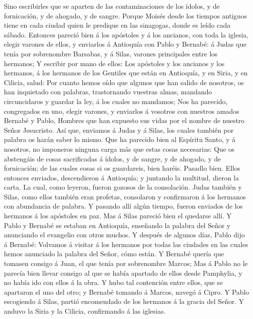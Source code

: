  Sino escribirles que se aparten de las contaminaciones de
los ídolos, y de fornicación, y de ahogado, y de sangre. 
Porque Moisés desde los tiempos antiguos tiene en cada ciudad quien le
predique en las sinagogas, donde es leído cada sábado. 
Entonces pareció bien á los apóstoles y á los ancianos, con toda la
iglesia, elegir varones de ellos, y enviarlos á Antioquía con Pablo y
Bernabé: á Judas que tenía por sobrenombre Barsabas, y á Silas, varones
principales entre los hermanos;  Y escribir por mano de
ellos: Los apóstoles y los ancianos y los hermanos, á los hermanos de
los Gentiles que están en Antioquía, y en Siria, y en Cilicia, salud:
 Por cuanto hemos oído que algunos que han salido de
nosotros, os han inquietado con palabras, trastornando vuestras almas,
mandando circuncidaros y guardar la ley, á los cuales no mandamos;
 Nos ha parecido, congregados en uno, elegir varones, y
enviarlos á vosotros con nuestros amados Bernabé y Pablo, 
Hombres que han expuesto sus vidas por el nombre de nuestro Señor
Jesucristo.  Así que, enviamos á Judas y á Silas, los
cuales también por palabra os harán saber lo mismo.  Que ha
parecido bien al Espíritu Santo, y á nosotros, no imponeros ninguna
carga más que estas cosas necesarias:  Que os abstengáis de
cosas sacrificadas á ídolos, y de sangre, y de ahogado, y de
fornicación; de las cuales cosas si os guardareis, bien haréis. Pasadlo
bien.  Ellos entonces enviados, descendieron á Antioquía; y
juntando la multitud, dieron la carta.  La cual, como
leyeron, fueron gozosos de la consolación.  Judas también y
Silas, como ellos también eran profetas, consolaron y confirmaron á los
hermanos con abundancia de palabra.  Y pasando allí algún
tiempo, fueron enviados de los hermanos á los apóstoles en paz.
 Mas á Silas pareció bien el quedarse allí.  Y
Pablo y Bernabé se estaban en Antioquía, enseñando la palabra del Señor
y anunciando el evangelio con otros muchos.  Y después de
algunos días, Pablo dijo á Bernabé: Volvamos á visitar á los hermanos
por todas las ciudades en las cuales hemos anunciado la palabra del
Señor, cómo están.  Y Bernabé quería que tomasen consigo á
Juan, el que tenía por sobrenombre Marcos;  Mas á Pablo no
le parecía bien llevar consigo al que se había apartado de ellos desde
Pamphylia, y no había ido con ellos á la obra.  Y hubo tal
contención entre ellos, que se apartaron el uno del otro; y Bernabé
tomando á Marcos, navegó á Cipro.  Y Pablo escogiendo á
Silas, partió encomendado de los hermanos á la gracia del Señor.
 Y anduvo la Siria y la Cilicia, confirmando á las
iglesias.

